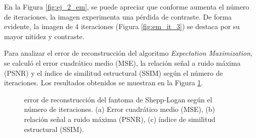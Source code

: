 \documentclass[11pt, twocolumn]{article}
\begin{document}
En la Figura \ref{fig:ej_2_em}, se puede apreciar que conforme aumenta el número de iteraciones, la imagen experimenta una pérdida de contraste. De forma evidente, la imagen de 4 iteraciones (Figura \ref{fig:em_it_3}) se destaca por su mayor nitidez y contraste. 

Para analizar el error de reconstrucción del algoritmo \textit{Expectation Maximization}, se calculó el error cuadrático medio (MSE), la relación señal a ruido máxima (PSNR) y el índice de similitud estructural (SSIM) según el número de iteraciones. Los resultados obtenidos se muestran en la Figura \ref{fig:ej_2_em_metrics}.

\begin{figure}[htbp]
  \centering
  \hfill
  \hfill
  \hfill
  \caption{error de reconstrucción del fantoma de Shepp-Logan según el número de iteraciones. (a) Error cuadrático medio (MSE), (b) relación señal a ruido máxima (PSNR), (c) índice de similitud estructural (SSIM).}
  \label{fig:ej_2_em_metrics}
\end{figure}
\end{document}
